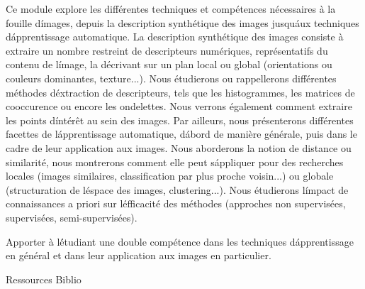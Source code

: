 \vfill

{
Ce module explore les différentes techniques et compétences nécessaires à la fouille d\'images, depuis la description synthétique des images jusqu\'aux techniques d\'apprentissage automatique.
La description synthétique des images consiste à extraire un nombre restreint de descripteurs numériques, représentatifs du contenu de l\'image, la décrivant sur un plan local ou global (orientations ou couleurs dominantes, texture...). Nous étudierons ou rappellerons différentes méthodes d\'extraction de descripteurs, tels que les histogrammes, les matrices de cooccurence ou encore les ondelettes. Nous verrons également comment extraire les points d\'intérêt au sein des images.
Par ailleurs, nous présenterons différentes facettes de l\'apprentissage automatique, d\'abord de manière générale, puis dans le cadre de leur application aux images.
Nous aborderons la notion de distance ou similarité, nous montrerons comment elle peut s\'appliquer pour des recherches locales (images similaires, classification par plus proche voisin...) ou globale (structuration de l\'espace des images, clustering...).
Nous étudierons l\'impact de connaissances a priori sur l\'efficacité des méthodes (approches non supervisées, supervisées, semi-supervisées). 
} 
{} 
{\begin{itemize}
\ObjItem Apporter à l\'étudiant une double compétence dans les techniques d\'apprentissage en général et dans leur application aux images en particulier.
\end{itemize} 
} 
{Ressources} 
{Biblio} 
 
\vfill

